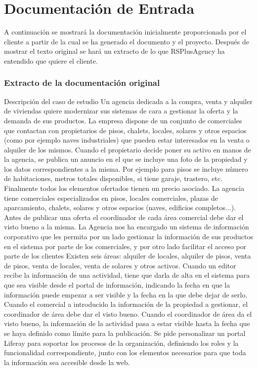 \chapter{Documentación de Entrada}\label{sec:initialdocs}
\par A continuación se mostrará la documentación inicialmente proporcionada por el cliente a partir de la cual se ha generado el documento y el proyecto. Después de mostrar el texto original se hará un extracto de lo que RSPlusAgency ha entendido que quiere el cliente.
\subsection{Extracto de la documentación original}
\begin{minipage}{30em}
  Descripción del caso de estudio
Un agencia dedicada a la compra, venta y alquiler de viviendas quiere modernizar sus
sistemas de cara a gestionar la oferta y la demanda de sus productos.
La empresa dispone de un conjunto de comerciales que contactan con propietarios de
pisos, chalets, locales, solares y otros espacios (como por ejemplo naves industriales)
que pueden estar interesados en la venta o alquiler de los mismos. Cuando el
propietario decide poner su activo en manos de la agencia, se publica un anuncio en el
que se incluye una foto de la propiedad y los datos correspondientes a la misma. Por
ejemplo para pisos se incluye número de habitaciones, metros totales disponibles, si
tiene garaje, trastero, etc. Finalmente todos los elementos ofertados tienen un precio
asociado.
La agencia tiene comerciales especializados en pisos, locales comerciales, plazas de
aparcamiento, chalets, solares y otros espacios (naves, edificios completos...). Antes
de publicar una oferta el coordinador de cada área comercial debe dar el visto bueno a
la misma.
La Agencia nos ha encargado un sistema de información corporativo que les permita
por un lado gestionar la información de sus productos en el sistema por parte de los
comerciales, y por otro lado facilitar el acceso por parte de los clientes
Existen seis áreas: alquiler de locales, alquiler de pisos, venta de pisos, venta de
locales, venta de solares y otros activos. Cuando un editor recibe la información de una
actividad, tiene que darla de alta en el sistema para que sea visible desde el portal de
información, indicando la fecha en que la información puede empezar a ser visible y la
fecha en la que debe dejar de serlo.
Cuando el comercial a introducido la información de la propiedad a gestionar, el
coordinador de área debe dar el visto bueno. Cuando el coordinador de área da el
visto bueno, la información de la actividad pasa a estar visible hasta la fecha que se
haya definido como límite para la publicación.
Se pide personalizar un portal Liferay para soportar los procesos de la organización,
definiendo los roles y la funcionalidad correspondiente, junto con los elementos
necesarios para que toda la información sea accesible desde la web.


\end{minipage}
